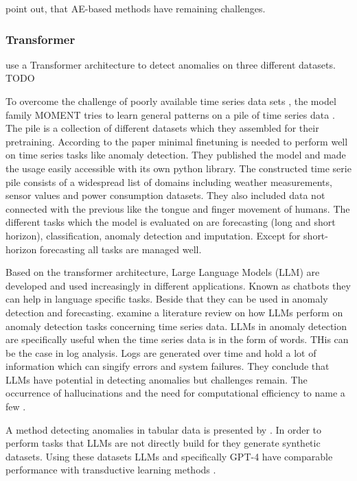  point out, that AE-based methods have remaining challenges.

\subsubsection{Transformer}
 use a Transformer architecture to detect anomalies on three different datasets. TODO

To overcome the challenge of poorly available time series data sets , the model family MOMENT tries to learn general patterns on a pile of time series data . The pile is a collection of different datasets which they assembled for their pretraining. According to the paper minimal finetuning is needed to perform well on time series tasks like anomaly detection. They published the model and made the usage easily accessible with its own python library. The constructed time serie pile consists of a widespread list of domains including weather measurements, sensor values and power consumption datasets. They also included data not connected with the previous like the tongue and finger movement of humans. The different tasks which the model is evaluated on are forecasting (long and short horizon), classification, anomaly detection and imputation. Except for short-horizon forecasting all tasks are managed well.

Based on the transformer architecture, Large Language Models (LLM) are developed and used increasingly in different applications. Known as chatbots they can help in language specific tasks. Beside that they can be used in anomaly detection and forecasting.  examine a literature review on how LLMs perform on anomaly detection tasks concerning time series data. LLMs in anomaly detection are specifically useful when the time series data is in the form of words. THis can be the case in log analysis. Logs are generated over time and hold a lot of information which can singify errors and system failures. They conclude that LLMs have potential in detecting anomalies but challenges remain. The occurrence of hallucinations and the need for computational efficiency to name a few .

A method detecting anomalies in tabular data is presented by . In order to perform tasks that LLMs are not directly build for they generate synthetic datasets. Using these datasets LLMs and specifically GPT-4 have comparable performance with transductive learning methods .

